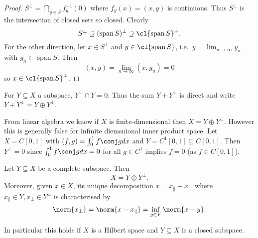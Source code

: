\documentclass[a4paper]{article}
\DeclareMathOperator{\spans}{span} %
\begin{document}
\begin{proof}
  \(S^\perp = \bigcap_{y \in S} f^{-1}_y(0)\) where \(f_y(x) = (x, y)\) is continuous. Thus \(S^\perp\) is the intersection of closed sets so closed. Clearly
  \[
    S^\perp \supseteq (\spans S)^\perp \supseteq \cl{\spans S}^\perp.
  \]
  For the other direction, let \(x \in S^\perp\) and \(y \in \cl{\spans S}\), i.e.\ \(y = \lim_{n \to \infty} y_n\) with \(y_n \in \spans S\). Then
  \[
    (x, y) = \lim_{n \to \infty} (x, y_n) = 0
  \]
  so \(x \in \cl{\spans S}^\perp\).
\end{proof}

\begin{notation}
  For \(Y \subseteq X\) a subspace, \(Y^\perp \cap Y = 0\). Thus the sum \(Y + Y^\perp\) is direct and write \(Y + Y^\perp = Y \oplus Y^\perp\).
\end{notation}

\begin{eg}
  From linear algebra we know if \(X\) is finite-dimensional then \(X = Y \oplus Y^\perp\). However this is generally false for infinite diemsnional inner product space. Let \(X = C[0, 1]\) with \((f, g) = \int_0^1 f \conj g dx\) and \(Y = C^1[0, 1] \subseteq C[0, 1]\). Then \(Y^\perp = 0\) since \(\int_0^1 f \conj g dx = 0\) for all \(g \in C^1\) implies \(f = 0\) (as \(f \in C[0, 1]\)).
\end{eg}

\begin{theorem}
  \label{thm:orthogonal decomposition}
  Let \(Y \subseteq X\) be a complete subspace. Then
  \[
    X = Y \oplus Y^\perp.
  \]
  Moreover, given \(x \in X\), its unique decomposition \(x = x_\parallel + x_\perp\) where \(x_\parallel \in Y, x_\perp \in Y^\perp\) is characterised by
  \[
    \norm{x_\perp} = \norm{x - x_\parallel} = \inf_{y \in Y} \norm{x - y}.
  \]
\end{theorem}

In particular this holds if \(X\) is a Hilbert space and \(Y \subseteq X\) is a closed subspace.
\end{document}

